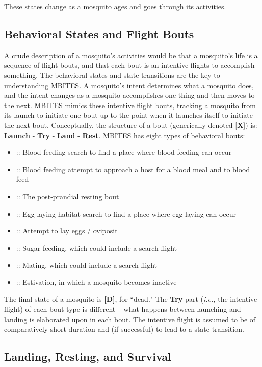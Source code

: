 \documentclass{article}
\newcommand{\ie}{{\em i.e., }}
\newcommand{\Bbout}{{\bf [B]}}
\newcommand{\Fbout}{{\bf [F]}}
\newcommand{\Rbout}{{\bf [R]}}
\newcommand{\Lbout}{{\bf [L]}}
\newcommand{\Obout}{{\bf [O]}}
\newcommand{\Sbout}{{\bf [S]}}
\newcommand{\Mbout}{{\bf [M]}}
\newcommand{\Ebout}{{\bf [E]}}
\newcommand{\Dead}{{\bf [D]}}
\begin{document}
These states change as a mosquito ages and goes through its activities. 

\subsection{Behavioral States and Flight Bouts}

A crude description of a mosquito's activities would be that a mosquito's life is a sequence of flight bouts, and that each bout is an intentive flights to accomplish something. The behavioral states and state transitions are the key to understanding MBITES. A mosquito's intent determines what a mosquito does, and the intent changes as a mosquito accomplishes one thing and then moves to the next. MBITES mimics these intentive flight bouts, tracking a  mosquito from its launch to initiate one bout up to the point when it launches itself to initiate the next bout. Conceptually, the structure of a bout (generically denoted [{\bf X}]) is:  {\bf Launch} - {\bf Try} - {\bf Land} - {\bf Rest}. MBITES has  eight types of behavioral bouts: 
\begin{itemize}
\item[\Fbout] :: Blood feeding search  to find a place where blood feeding can occur
\item[\Bbout] :: Blood feeding attempt to approach a host for a blood meal and to blood feed
\item[\Rbout] :: The post-prandial resting bout
\item[\Lbout] :: Egg laying habitat search to find a place where egg laying can occur
\item[\Obout] :: Attempt to lay eggs / oviposit 
\item[\Sbout] :: Sugar feeding, which could include a search flight 
\item[\Mbout] :: Mating, which could include a search flight 
\item[\Ebout] :: Estivation, in which a mosquito becomes inactive 
\end{itemize}
%
The final state of a mosquito is \Dead, for ``dead." The {\bf Try} part (\ie the intentive flight) of each bout type  is different -- what happens between launching and landing is elaborated upon in each bout. The intentive flight is assumed to be of comparatively short duration and (if successful) to lead to a state transition. 

\subsection{Landing, Resting, and Survival}
\end{document}
